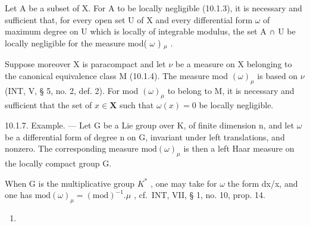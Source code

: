 Let A be a subset of X. For A to be locally negligible (10.1.3), it is necessary and sufficient that, for every open set U of X and every differential form \(\omega\) of maximum degree on U which is locally of integrable modulus, the set A ∩ U be locally negligible for the measure mod( \(\omega\) ) \(_{\mu}\) .

Suppose moreover X is paracompact and let \(\nu\) be a measure on X belonging to the canonical equivalence class M (10.1.4). The measure mod \((\omega)_{\mu}\) is based on \(\nu\) (INT, V, § 5, no. 2, def. 2). For mod \((\omega)_{\mu}\) to belong to M, it is necessary and sufficient that the set of \(x \in \mathbf{X}\) such that \(\omega(x) = 0\) be locally negligible.

10.1.7. Example. --- Let G be a Lie group over K, of finite dimension n, and let \(\omega\) be a differential form of degree n on G, invariant under left translations, and nonzero. The corresponding measure \(\text{mod}(\omega)_{\mu}\) is then a left Haar measure on the locally compact group G.

When G is the multiplicative group \(K^{*}\) , one may take for \(\omega\) the form dx/x, and one has \(\text{mod}(\omega)_{\mu} = (\text{mod})^{-1}.\mu\) , cf.~INT, VII, § 1, no. 10, prop. 14.
\begin{enumerate}
\def\labelenumi{(\arabic{enumi})}
\setcounter{enumi}{6}
\tightlist
\item
\end{enumerate}
